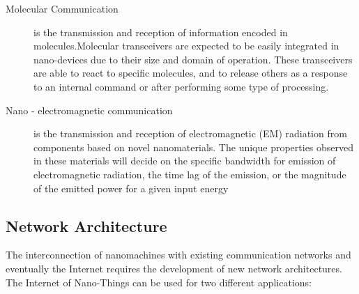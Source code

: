 \documentclass{report}
\begin{document}
    \begin{enumerate}
    
        \begin{description}
        
            \item[Molecular Communication] is the transmission and reception of information encoded in molecules.Molecular transceivers are expected to be easily integrated in nano-devices due to their size and domain of operation. These transceivers are able to react to specific molecules, and to release others as a response to an internal command or after performing some type of processing.
            
            \item[Nano - electromagnetic communication] is the transmission and reception of electromagnetic (EM) radiation from components based on novel nanomaterials. The unique properties observed in these materials will decide on the specific bandwidth for emission of electromagnetic radiation, the time lag of the emission, or the magnitude of the emitted power for a given input energy
            
        \end{description}
        
    \end{enumerate}

\subsection*{Network Architecture}

    The interconnection of nanomachines with existing communication networks and eventually the Internet requires the development of new network architectures. The Internet of Nano-Things can be used for two different applications:
    
\end{document}

